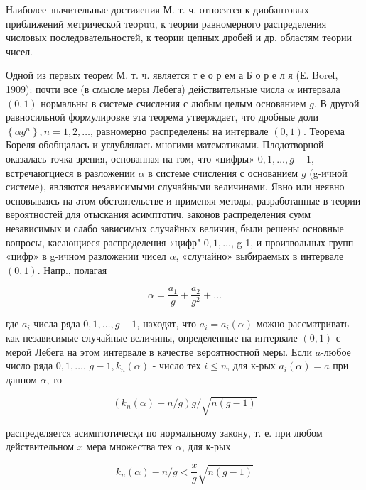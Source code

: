\documentclass[10pt]{article}
\begin{document}
Наиболее значительные достияения М. т. ч. относятся к диобантовых приближений метрической теоpuu, к теории равномерного распределения числовых последовательностей, к теории цепных дробей и др. областям теории чисел.



Одной из первых теорем М. т. ч. является т е о р ем а Б о р е л я (Е. Borel, 1909): почти все (в смысле меры Лебега) действительные числа $\alpha$ интервала $(0,1)$ нормальны в системе счисления с любым целым основанием $g$. В другой равносильной формулировке эта теорема утверждает, что дробные доли $\left\{\alpha g^{n}\right\}, n=1,2, \ldots$, равномерно распределены на интервале $(0,1)$. Теорема Бореля обобщалась и углублялась многими математиками. Плодотворной оказалась точка зрения, основанная на том, что «цифры» $0,1, \ldots, g-1$, встречаюгциеся в разложении $\alpha$ в системе счисления с основанием $g$ (g-ичной системе), являются независимыми случайными величинами. Явно или неявно основываясь на әтом обстоятельстве и применяя методы, разработанные в теории вероятностей для отыскания асимптотич. законов распределения сумм независимых и слабо зависимых случайных величин, были решены основные вопросы, касающиеся распределения «цифр" $0,1, \ldots$, g-1, и произвольных групп «цифр» в g-ичном разложении чисел $\alpha$, «случайно» выбираемых в интервале $(0,1)$. Напр., полагая



\[

\alpha=\frac{a_{1}}{g}+\frac{a_{2}}{g^{2}}+\ldots

\]



где $a_{i}$-числа ряда $0,1, \ldots, g-1$, находят, что $a_{i}=a_{i}(\alpha)$ можно рассматривать как независимые случайные величины, определенные на интервале $(0,1)$ с мерой Лебега на этом интервале в качестве вероятностной меры. Если $a$-любое число ряда $0,1, \ldots$, $g-1, k_{n}(\alpha)$ - число тех $i \leqslant n$, для к-рых $a_{i}(\alpha)=a$ при данном $\alpha$, то



\[

\left(k_{n}(\alpha)-n / g\right) g / \sqrt{n(g-1)}

\]



распределяется асимптотичесқи по нормальному закону, т. е. при любом действительном $x$ мера множества тех $\alpha$, для к-рых



\[

k_{n}(\alpha)-n / g<\frac{x}{g} \sqrt{n(g-1)}

\]
\end{document}
